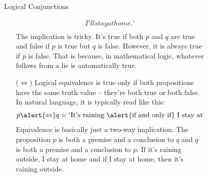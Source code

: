 \documentclass[final]{beamer}
\newlength{\sepwidth}
\newlength{\colwidth}
\newcommand{\separatorcolumn}{\begin{column}{\sepwidth}\end{column}}
\begin{document}
\begin{frame}[t]
\begin{columns}[t]
\begin{column}{\colwidth}
\begin{exampleblock}{Logical Conjunctions}
\begin{itemize}[left=40pt]
\begin{align*}
{     I'll stay at home.'}\\
    \end{align*}
    The implication is tricky. It's true if both $p$ and $q$ are true and false
    if $p$ is true but $q$ is false. However, it is \alert{always true} if $p$
    is \alert{false}. That is because, in mathematical logic, whatever follows
    from a lie is automatically true.
   \item[($ \Leftrightarrow $)] Logical \alert{equivalence} is true only if both
    propositions have the \alert{same truth value} -- they're both true or both
    false. In natural language, it is typically read like this:
    \[
     p \alert{ \Leftrightarrow }q = \text{`It's raining \alert{if and only if}
     I stay at home.'}
    \]
    Equivalence is basically just a two-way implication. The proposition $p$ is
    both a premise and a conclusion to $q$ and $q$ is both a premise and a
    conclusion to $p$. If it's raining outside, I stay at home and if I stay at
    home, then it's raining outside.
  \end{itemize}
 \end{exampleblock}
\end{column}

\separatorcolumn

\begin{column}{\colwidth}




\end{column}
\separatorcolumn

\begin{column}{\colwidth}



\end{column}
\separatorcolumn

\end{columns}
\end{frame}
\end{document}

